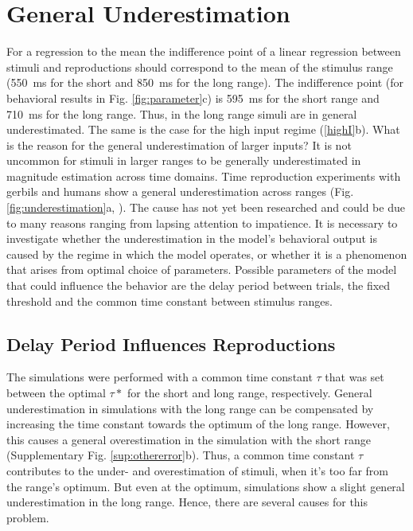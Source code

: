 \documentclass[10pt]{article}
\begin{document}
\section{General Underestimation}
For a regression to the mean the indifference point of a linear regression between stimuli and reproductions should correspond to the mean of the stimulus range (550~ms for the short and 850~ms for the long range).
The indifference point (for behavioral results in Fig. \ref{fig:parameter}c) is 595~ms for the short range and 710~ms for the long range. Thus, in the long range simuli are in general underestimated. 
The same is the case for the high input regime (\ref{highI}b).
What is the reason for the general underestimation of larger inputs? 
It is not uncommon for stimuli in larger ranges to be generally underestimated in magnitude estimation across time domains. Time reproduction experiments with gerbils and humans show a general underestimation across ranges (Fig. \ref{fig:underestimation}a, \cite{Henke2022}). 
The cause has not yet been researched and could be due to many reasons ranging from lapsing attention to impatience. 
It is necessary to investigate whether the underestimation in the model's behavioral output is caused by the regime in which the model operates, or whether it is a phenomenon that arises from optimal choice of parameters.
Possible parameters of the model that could influence the behavior are the delay period between trials, the fixed threshold and the common time constant between stimulus ranges. 

\subsection{Delay Period Influences Reproductions}
The simulations were performed with a common time constant $\tau$ that was set between the optimal $\tau*$ for the short and long range, respectively.
General underestimation in simulations with the long range can be compensated by increasing the time constant towards the optimum of the long range. However, this causes a general overestimation in the simulation with the short range (Supplementary Fig. \ref{sup:othererror}b). 
Thus, a common time constant $\tau$ contributes to the under- and overestimation of stimuli, when it's too far from the range's optimum. But even at the optimum, simulations show a slight general underestimation in the long range.
Hence, there are several causes for this problem.
\end{document}

